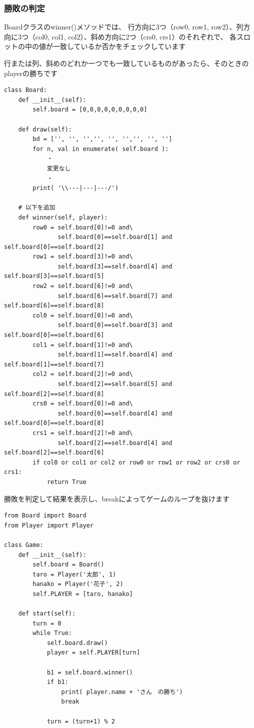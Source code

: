 \documentclass[uplatex,a4paper,11pt,oneside,openany]{jsbook}
\begin{document}
\subsubsection{勝敗の判定}

Boardクラスのwinner()メソッドでは、
行方向に3つ（row0, row1, row2）、列方向に3つ（col0, col1, col2）、斜め方向に2つ（crs0, crs1）のそれぞれで、
各スロットの中の値が一致しているか否かをチェックしています

行または列、斜めのどれか一つでも一致しているものがあったら、そのときのplayerの勝ちです

\begin{lstlisting}[caption=class Board,label=prog03-5]
class Board:
    def __init__(self):
        self.board = [0,0,0,0,0,0,0,0,0]

    def draw(self):
        bd = ['', '', '','', '', '','', '', '']
        for n, val in enumerate( self.board ):
            ・
            変更なし
            ・
        print( '\\---|---|---/')

    # 以下を追加
    def winner(self, player):
        row0 = self.board[0]!=0 and\
               self.board[0]==self.board[1] and self.board[0]==self.board[2]
        row1 = self.board[3]!=0 and\
               self.board[3]==self.board[4] and self.board[3]==self.board[5]
        row2 = self.board[6]!=0 and\
               self.board[6]==self.board[7] and self.board[6]==self.board[8]
        col0 = self.board[0]!=0 and\
               self.board[0]==self.board[3] and self.board[0]==self.board[6]
        col1 = self.board[1]!=0 and\
               self.board[1]==self.board[4] and self.board[1]==self.board[7]
        col2 = self.board[2]!=0 and\
               self.board[2]==self.board[5] and self.board[2]==self.board[8]
        crs0 = self.board[0]!=0 and\
               self.board[0]==self.board[4] and self.board[0]==self.board[8]
        crs1 = self.board[2]!=0 and\
               self.board[2]==self.board[4] and self.board[2]==self.board[6]
        if col0 or col1 or col2 or row0 or row1 or row2 or crs0 or crs1:
            return True
\end{lstlisting}%

勝敗を判定して結果を表示し、breakによってゲームのループを抜けます

\begin{lstlisting}[caption=class Game,label=prog03-6]
from Board import Board
from Player import Player

class Game:
    def __init__(self):
        self.board = Board()
        taro = Player('太郎', 1)
        hanako = Player('花子', 2)
        self.PLAYER = [taro, hanako]

    def start(self):
        turn = 0
        while True:
            self.board.draw()
            player = self.PLAYER[turn]

            b1 = self.board.winner()
            if b1:
                print( player.name + 'さん　の勝ち')
                break

            turn = (turn+1) % 2
\end{lstlisting}%
\end{document}
